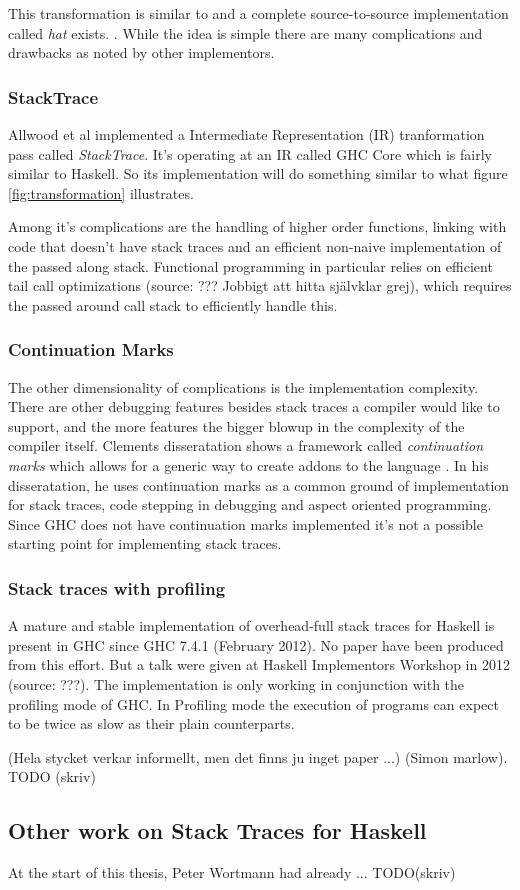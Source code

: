 This transformation is similar to
\cite{ghc_wiki_explicitcs_transformation}  and a complete
source-to-source implementation called \emph{hat} exists.
\cite{hat_website}.  While the idea is simple there are many
complications and drawbacks as noted by other implementors.

\subsubsection{StackTrace}

Allwood et al implemented a Intermediate Representation (IR) tranformation
pass called \emph{StackTrace}. It's operating at an IR called GHC Core which
is fairly similar to Haskell. So its implementation will do something
similar to what figure \ref{fig:transformation} illustrates.

Among it's complications are the
handling of higher order functions, linking with code that doesn't have stack
traces and an efficient non-naive implementation of the
passed along stack. \cite{FindingTheNeedle2009}
Functional programming in particular relies on efficient tail call
optimizations (source: ??? Jobbigt att hitta självklar grej), which
requires the passed around call stack to efficiently handle this.

\subsubsection{Continuation Marks}

The other dimensionality of complications is the implementation
complexity.  There are other debugging features besides stack traces a
compiler would like to support, and the more features the bigger blowup
in the complexity of the compiler itself.  Clements disseratation shows
a framework called \emph{continuation marks} which allows for a generic
way to create addons to the language \cite{clements_dissertation2005} .
In his disseratation, he uses continuation marks as a common ground of
implementation for stack traces, code stepping in debugging and aspect
oriented programming.  Since GHC does not have continuation marks
implemented it's not a possible starting point for implementing stack
traces.

\subsubsection{Stack traces with profiling}

A mature and stable implementation of overhead-full stack traces for
Haskell is present in GHC since GHC 7.4.1 (February 2012). No paper have
been produced from this effort. But a talk were given at Haskell
Implementors Workshop in 2012 (source: ???). The implementation is only
working in conjunction with the profiling mode of GHC. In Profiling mode
the execution of programs can expect to be twice as slow as their plain
counterparts.

(Hela stycket verkar informellt, men det finns ju inget paper ...)
(Simon marlow). TODO (skriv) %


\subsection{Other work on Stack Traces for Haskell}

At the start of this thesis, Peter Wortmann had already ... TODO(skriv) %
